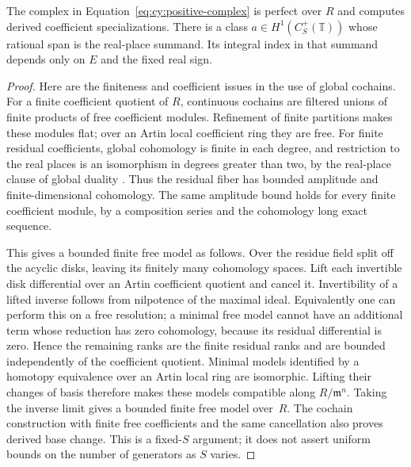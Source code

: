 \begin{lemma}\label{lem:cy:positive-model}
The complex in Equation~\eqref{eq:cy:positive-complex} is perfect over $R$ and computes derived
coefficient specializations.  There is a class $a\in H^1(C_S^+(\mathbb T))$
whose rational span is the real-place summand.  Its integral index in
that summand depends only on $E$ and the fixed real sign.
\end{lemma}
\begin{proof}
Here are the finiteness and coefficient issues in the use of global
cochains.  For a finite coefficient quotient of $R$, continuous cochains
are filtered unions of finite products of free coefficient modules.
Refinement of finite partitions makes these modules flat; over an Artin
local coefficient ring they are free.  For finite residual coefficients,
global cohomology is finite in each degree, and restriction to the real
places is an isomorphism in degrees greater than two, by the real-place
clause of global duality \cite[\S5.7.1.7]{Nekovar2006}.
Thus the residual fiber has bounded
amplitude and finite-dimensional cohomology.  The same amplitude bound
holds for every finite coefficient module, by a composition series and
the cohomology long exact sequence.

This gives a bounded finite free model as follows.  Over the residue
field split off the acyclic disks, leaving its finitely many cohomology
spaces.  Lift each invertible disk differential over an Artin coefficient
quotient and cancel it.  Invertibility of a lifted inverse follows from
nilpotence of the maximal ideal.  Equivalently one can perform this on a
free resolution; a minimal free model cannot have an additional term
whose reduction has zero cohomology, because its residual differential
is zero.  Hence the remaining ranks are the finite residual ranks and
are bounded independently of the coefficient quotient.  Minimal models
identified by a homotopy equivalence over an Artin local ring are
isomorphic.  Lifting their changes of basis therefore makes these models
compatible along $R/\mathfrak m^n$.  Taking the inverse limit gives a
bounded finite free model over~$R$.  The cochain construction with finite
free coefficients and the same cancellation also proves derived base
change.  This is a fixed-$S$ argument; it does not assert uniform bounds
on the number of generators as $S$ varies.


\end{proof}
